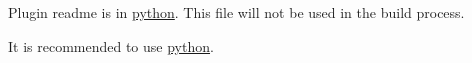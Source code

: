 Plugin readme is in \mbox{\hyperlink{autotoc_md538_src_plugins_python_README_md}{python}}. This file will not be used in the build process.

It is recommended to use \mbox{\hyperlink{autotoc_md538_src_plugins_python_README_md}{python}}. 